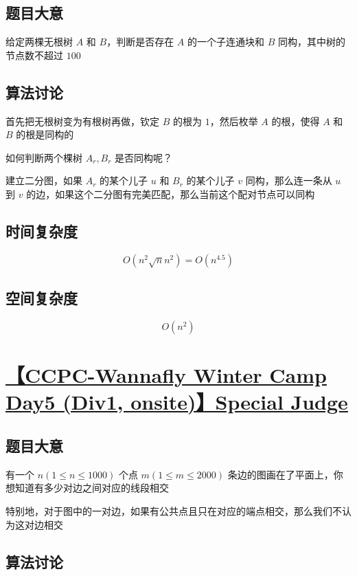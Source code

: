 \documentclass[UTF8]{article}
\begin{document}
\subsection{题目大意}

给定两棵无根树 $A$ 和 $B$，判断是否存在 $A$ 的一个子连通块和 $B$ 同构，其中树的节点数不超过 $100$

\subsection{算法讨论}

首先把无根树变为有根树再做，钦定 $B$ 的根为 $1$，然后枚举 $A$ 的根，使得 $A$ 和 $B$ 的根是同构的

如何判断两个棵树 $A_r,B_r$ 是否同构呢？

建立二分图，如果 $A_r$ 的某个儿子 $u$ 和 $B_r$ 的某个儿子 $v$ 同构，那么连一条从 $u$ 到 $v$ 的边，如果这个二分图有完美匹配，那么当前这个配对节点可以同构

\subsection{时间复杂度}

$$
O(n^2 \sqrt{n} n^2)=O(n^{4.5})
$$

\subsection{空间复杂度}

$$
O(n^2)
$$

\section{\href{https://www.zhixincode.com/contest/20/problem/J?problem_id=305}{【CCPC-Wannafly Winter Camp Day5 (Div1, onsite)】Special Judge}}

\subsection{题目大意}

有一个 $n(1 \le n \le 1000)$ 个点 $m(1 \le m \le 2000)$ 条边的图画在了平面上，你想知道有多少对边之间对应的线段相交

特别地，对于图中的一对边，如果有公共点且只在对应的端点相交，那么我们不认为这对边相交

\subsection{算法讨论}
\end{document}

